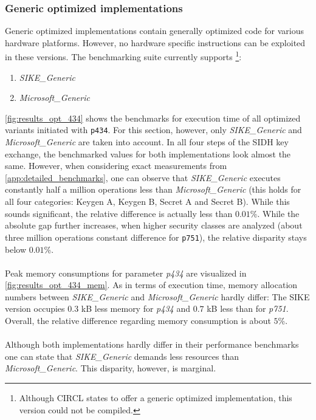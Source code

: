 \subsubsection{Generic optimized implementations}\label{sec:analysis_generic}
Generic optimized implementations contain generally optimized code for various hardware platforms. However, no hardware specific instructions can be exploited in these versions. The benchmarking suite currently supports \footnote{Although CIRCL states to offer a generic optimized implementation\parencite{circl2020github}, this version could not be compiled.}:
\begin{enumerate}
\item \textit{SIKE\_Generic}
\item \textit{Microsoft\_Generic}
\end{enumerate}
\autoref{fig:results_opt_434} shows the benchmarks for execution time of all optimized variants initiated with \texttt{p434}. For this section, however, only \textit{SIKE\_Generic} and \textit{Microsoft\_Generic} are taken into account. In all four steps of the SIDH key exchange, the benchmarked values for both implementations look almost the same. However, when considering exact measurements from  \ref{app:detailed_benchmarks}, one can observe that \textit{SIKE\_Generic} executes constantly half a million operations less than \textit{Microsoft\_Generic} (this holds for all four categories: Keygen A, Keygen B, Secret A and Secret B). While this sounds significant, the relative difference is actually less than $0.01$\%. While the absolute gap further increases, when higher security classes are analyzed (about three million operations constant difference for \texttt{p751}), the relative disparity stays below $0.01$\%.
\\\\
Peak memory consumptions for parameter \textit{p434} are visualized in  \autoref{fig:results_opt_434_mem}. As in terms of execution time, memory allocation numbers between \textit{SIKE\_Generic} and \textit{Microsoft\_Generic} hardly differ: The SIKE version occupies $0.3$ kB less memory for \textit{p434} and $0.7$ kB less than for \textit{p751}. Overall, the relative difference regarding memory consumption is about $5$\%.
\\\\
Although both implementations hardly differ in their performance benchmarks one can state that \textit{SIKE\_Generic} demands less resources than \textit{Microsoft\_Generic}. This disparity, however, is marginal.

